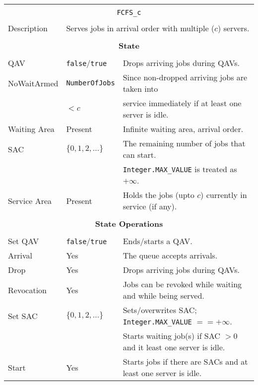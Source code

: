 \documentclass[12pt]{book}
\begin{document}
\begin{tabular}{|l|l|l|}
\hline
\multicolumn{3}{|c|}{} \\
\multicolumn{3}{|c|}{\lstinline[basicstyle=\large]{FCFS_c}} \\
\multicolumn{3}{|c|}{} \\
\hline
Description & \multicolumn{2}{|l|}{Serves jobs in arrival order with multiple ($c$) servers.} \\
\hline
\multicolumn{3}{|c|}{} \\
\multicolumn{3}{|c|}{\bf State} \\
\multicolumn{3}{|c|}{} \\
\hline
QAV & \lstinline|false|/\lstinline|true| & Drops arriving jobs during QAVs. \\
\hline
NoWaitArmed & \lstinline|NumberOfJobs| & Since non-dropped arriving jobs are taken into \\
            & $< c$                    & service immediately if at least one server is idle. \\
\hline
Waiting Area & Present & Infinite waiting area, arrival order. \\
\hline
SAC & $\{0, 1, 2, \ldots\}$ & The remaining number of jobs that can start. \\
    &                       & \lstinline|Integer.MAX_VALUE| is treated as $+\infty$. \\
\hline
Service Area & Present & Holds the jobs (upto $c$) currently in service (if any). \\
\hline
\multicolumn{3}{|c|}{} \\
\multicolumn{3}{|c|}{\bf State Operations} \\
\multicolumn{3}{|c|}{} \\
\hline
Set QAV & \lstinline|false|/\lstinline|true| & Ends/starts a QAV. \\
\hline
Arrival & Yes & The queue accepts arrivals. \\
\hline
Drop & Yes & Drops arriving jobs during QAVs. \\
\hline
Revocation & Yes & Jobs can be revoked while waiting and while being served. \\
\hline
Set SAC & $\{0, 1, 2, \ldots\}$ & Sets/overwrites SAC; \lstinline|Integer.MAX_VALUE| $== +\infty$. \\
        &                       & Starts waiting job(s) if SAC $> 0$ and it least one server is idle. \\
\hline
Start & Yes & Starts jobs if there are SACs and at least one server is idle. \\

\end{tabular}
\end{document}
